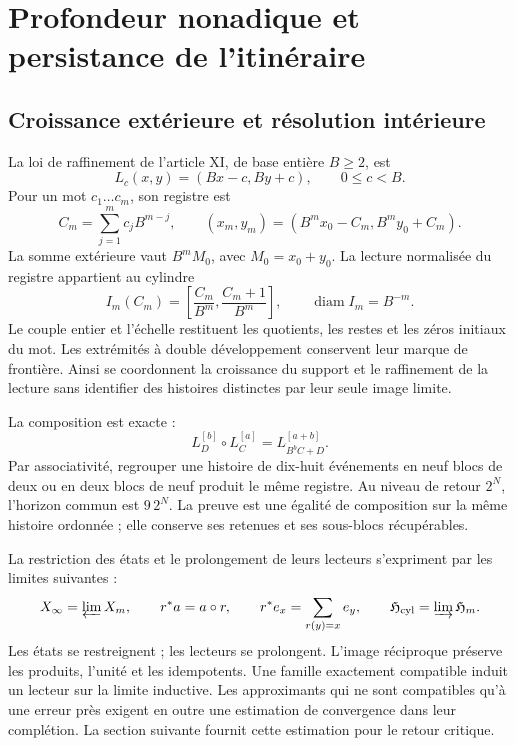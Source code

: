 \section{Profondeur nonadique et persistance de l’itinéraire}
\label{hmtfg:fragmento:profundidad-nonadica-y-persistencia-del-itinerario}

\subsection{Croissance extérieure et résolution intérieure}
\label{hmtfg:prolongacion:2}

La loi de raffinement de l’article XI, de base entière \(B\ge2\), est
\[
L_c(x,y)=(Bx-c,By+c),\qquad 0\le c<B.
\]
Pour un mot \(c_1\ldots c_m\), son registre est
\[
C_m=\sum_{j=1}^m c_jB^{m-j},\qquad
(x_m,y_m)=(B^mx_0-C_m,B^my_0+C_m).
\]
La somme extérieure vaut \(B^mM_0\), avec \(M_0=x_0+y_0\). La lecture normalisée du registre appartient au cylindre
\[
I_m(C_m)=\left[\frac{C_m}{B^m},\frac{C_m+1}{B^m}\right],
\qquad \operatorname{diam}I_m=B^{-m}.
\]
Le couple entier et l’échelle restituent les quotients, les restes et les zéros initiaux du mot. Les extrémités à double développement conservent leur marque de frontière. Ainsi se coordonnent la croissance du support et le raffinement de la lecture sans identifier des histoires distinctes par leur seule image limite.

La composition est exacte :
\[
L_D^{[b]}\circ L_C^{[a]}=L_{B^bC+D}^{[a+b]}.
\]
Par associativité, regrouper une histoire de dix-huit événements en neuf blocs de deux ou en deux blocs de neuf produit le même registre. Au niveau de retour \(2^N\), l’horizon commun est \(9\,2^N\). La preuve est une égalité de composition sur la même histoire ordonnée ; elle conserve ses retenues et ses sous-blocs récupérables.

La restriction des états et le prolongement de leurs lecteurs s’expriment par les limites suivantes :
\[
X_\infty=\varprojlim X_m,\qquad
r^*a=a\circ r,\qquad
r^*e_x=\sum_{r(y)=x}e_y,
\qquad \mathfrak H_{\rm cyl}=\varinjlim\mathfrak H_m.
\]
Les états se restreignent ; les lecteurs se prolongent. L’image réciproque préserve les produits, l’unité et les idempotents. Une famille exactement compatible induit un lecteur sur la limite inductive. Les approximants qui ne sont compatibles qu’à une erreur près exigent en outre une estimation de convergence dans leur complétion. La section suivante fournit cette estimation pour le retour critique.


